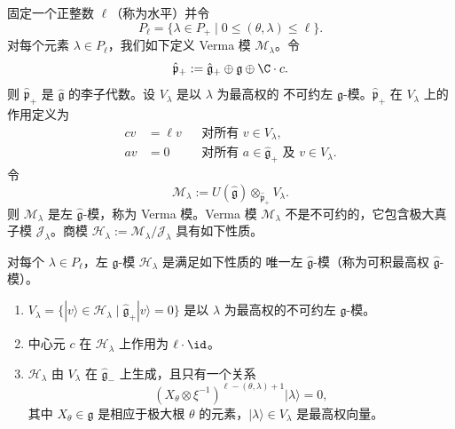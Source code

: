 固定一个正整数 $\ell$（称为水平）并令
\[
P_{\ell}=\{\lambda\in P_+\mid 0\le(\theta,\lambda)\le\ell\}.
\]
对每个元素 $\lambda\in P_{\ell}$，我们如下定义 Verma 模 $\mathcal{M}_{\lambda}$。令
\[
\hat{\mathfrak{p}}_+:=\hat{\mathfrak{g}}_+\oplus\mathfrak{g}\oplus\C\cdot c.
\]
则 $\hat{\mathfrak{p}}_+$ 是 $\hat{\mathfrak{g}}$ 的李子代数。设 $V_{\lambda}$ 是以 $\lambda$ 为最高权的
不可约左 $\mathfrak{g}$-模。$\hat{\mathfrak{p}}_+$ 在 $V_{\lambda}$ 上的作用定义为
\[
\begin{aligned}
cv&=\ell v &&\text{对所有 }v\in V_{\lambda},\\
av&=0 &&\text{对所有 }a\in\hat{\mathfrak{g}}_+\text{ 及 }v\in V_{\lambda}.
\end{aligned}
\]
令
\begin{equation}
\mathcal{M}_{\lambda}:=U(\hat{\mathfrak{g}})\otimes_{\hat{\mathfrak{p}}_+}V_{\lambda}. \tag{2.7}
\end{equation}
则 $\mathcal{M}_{\lambda}$ 是左 $\hat{\mathfrak{g}}$-模，称为 Verma 模。Verma 模
$\mathcal{M}_{\lambda}$ 不是不可约的，它包含极大真子模 $\mathcal{J}_{\lambda}$。商模
$\mathcal{H}_{\lambda}:=\mathcal{M}_{\lambda}/\mathcal{J}_{\lambda}$ 具有如下性质。

\begin{theorem}[2.4]
对每个 $\lambda\in P_{\ell}$，左 $\hat{\mathfrak{g}}$-模 $\mathcal{H}_{\lambda}$ 是满足如下性质的
唯一左 $\hat{\mathfrak{g}}$-模（称为可积最高权 $\hat{\mathfrak{g}}$-模）。
\begin{enumerate}
\item $V_{\lambda}=\{|v\rangle\in\mathcal{H}_{\lambda}\mid
\hat{\mathfrak{g}}_+|v\rangle=0\}$ 是以 $\lambda$ 为最高权的不可约左 $\mathfrak{g}$-模。
\item 中心元 $c$ 在 $\mathcal{H}_{\lambda}$ 上作用为 $\ell\cdot\id$。
\item $\mathcal{H}_{\lambda}$ 由 $V_{\lambda}$ 在 $\hat{\mathfrak{g}}_-$ 上生成，且只有一个关系
\begin{equation}
(X_{\theta}\otimes\xi^{-1})^{\ell-(\theta,\lambda)+1}|\lambda\rangle=0, \tag{2.8}
\end{equation}
其中 $X_{\theta}\in\mathfrak{g}$ 是相应于极大根 $\theta$ 的元素，$|\lambda\rangle\in V_{\lambda}$
是最高权向量。
\end{enumerate}
\end{theorem}

